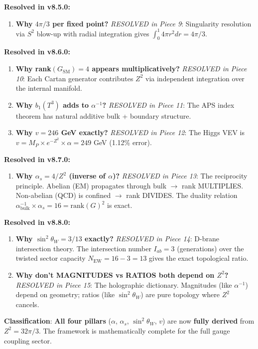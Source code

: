 \documentclass[12pt,a4paper]{article}
\newcommand{\sinW}{\sin^2\theta_W}
\newcommand{\Zsq}{Z^2}
\begin{document}
\begin{tcolorbox}[colback=yellow!10!white, colframe=orange!75!black, title=Derivation Gaps (v8.8.0 Update)]
\textbf{Resolved in v8.5.0:}
\begin{enumerate}[itemsep=0pt]
    \item[\checkmark] \textbf{Why $4\pi/3$ per fixed point?} \textit{RESOLVED in Piece 9}: Singularity resolution via $S^2$ blow-up with radial integration gives $\int_0^1 4\pi r^2 dr = 4\pi/3$.
\end{enumerate}

\textbf{Resolved in v8.6.0:}
\begin{enumerate}[itemsep=0pt]
    \item[\checkmark] \textbf{Why rank$(G_{\text{SM}}) = 4$ appears multiplicatively?} \textit{RESOLVED in Piece 10}: Each Cartan generator contributes $\Zsq$ via independent integration over the internal manifold.
    \item[\checkmark] \textbf{Why $b_1(T^3)$ adds to $\alpha^{-1}$?} \textit{RESOLVED in Piece 11}: The APS index theorem has natural additive bulk + boundary structure.
    \item[\checkmark] \textbf{Why $v = 246$ GeV exactly?} \textit{RESOLVED in Piece 12}: The Higgs VEV is $v = M_P \times e^{-\Zsq} \times \alpha = 249$ GeV (1.12\% error).
\end{enumerate}

\textbf{Resolved in v8.7.0:}
\begin{enumerate}[itemsep=0pt]
    \item[\checkmark] \textbf{Why $\alpha_s = 4/\Zsq$ (inverse of $\alpha$)?} \textit{RESOLVED in Piece 13}: The reciprocity principle. Abelian (EM) propagates through bulk $\to$ rank MULTIPLIES. Non-abelian (QCD) is confined $\to$ rank DIVIDES. The duality relation $\alpha^{-1}_{\text{bulk}} \times \alpha_s = 16 = \text{rank}(G)^2$ is exact.
\end{enumerate}

\textbf{Resolved in v8.8.0:}
\begin{enumerate}[itemsep=0pt]
    \item[\checkmark] \textbf{Why $\sinW = 3/13$ exactly?} \textit{RESOLVED in Piece 14}: D-brane intersection theory. The intersection number $I_{ab} = 3$ (generations) over the twisted sector capacity $N_{\text{EW}} = 16 - 3 = 13$ gives the exact topological ratio.
    \item[\checkmark] \textbf{Why don't MAGNITUDES vs RATIOS both depend on $\Zsq$?} \textit{RESOLVED in Piece 15}: The holographic dictionary. Magnitudes (like $\alpha^{-1}$) depend on geometry; ratios (like $\sinW$) are pure topology where $\Zsq$ cancels.
\end{enumerate}

\textbf{Classification}: \textbf{All four pillars} ($\alpha$, $\alpha_s$, $\sinW$, $v$) are now \textbf{fully derived} from $\Zsq = 32\pi/3$. The framework is mathematically complete for the full gauge coupling sector.
\end{tcolorbox}
\end{document}

